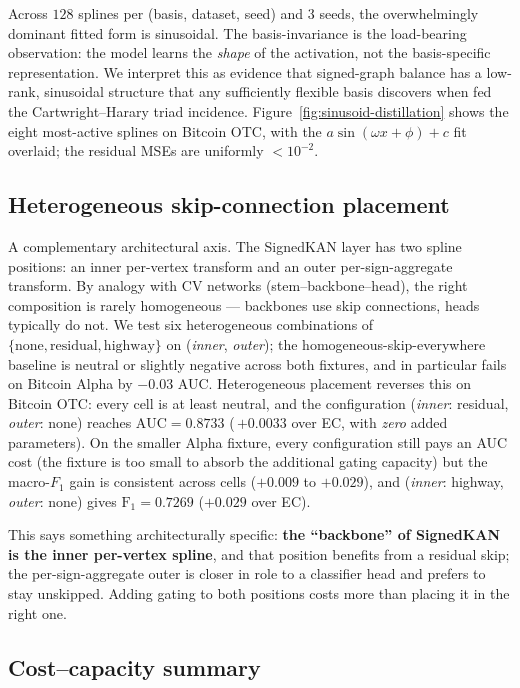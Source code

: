 Across $128$ splines per (basis, dataset, seed) and $3$ seeds, the
overwhelmingly dominant fitted form is sinusoidal. The
basis-invariance is the load-bearing observation: the model learns
the \emph{shape} of the activation, not the basis-specific
representation. We interpret this as evidence that signed-graph
balance has a low-rank, sinusoidal structure that any sufficiently
flexible basis discovers when fed the Cartwright--Harary triad
incidence.
Figure~\ref{fig:sinusoid-distillation} shows the eight most-active
splines on Bitcoin OTC, with the $a\sin(\omega x + \phi) + c$ fit
overlaid; the residual MSEs are uniformly $<\!10^{-2}$.

\subsection{Heterogeneous skip-connection placement}
\label{sec:heterogeneous-skip}

A complementary architectural axis. The SignedKAN layer has two
spline positions: an inner per-vertex transform and an outer
per-sign-aggregate transform. By analogy with CV networks
(stem--backbone--head), the right composition is rarely
homogeneous --- backbones use skip connections, heads typically do
not. We test six heterogeneous combinations of
$\{\text{none}, \text{residual}, \text{highway}\}$ on
(\textit{inner}, \textit{outer}); the homogeneous-skip-everywhere
baseline is neutral or slightly negative across both fixtures, and
in particular fails on Bitcoin Alpha by $-0.03$ AUC. Heterogeneous
placement reverses this on Bitcoin OTC: every cell is at least
neutral, and the configuration (\textit{inner}: residual,
\textit{outer}: none) reaches $\mathrm{AUC}\!=\!0.8733$
(\,$+0.0033$ over EC, with \emph{zero} added parameters). On the
smaller Alpha fixture, every configuration still pays an AUC cost
(the fixture is too small to absorb the additional gating capacity)
but the macro-$F_1$ gain is consistent across cells
($+0.009$ to $+0.029$), and (\textit{inner}: highway,
\textit{outer}: none) gives $\mathrm{F}_1\!=\!0.7269$
($+0.029$ over EC).

This says something architecturally specific: \textbf{the
``backbone'' of SignedKAN is the inner per-vertex spline}, and that
position benefits from a residual skip; the per-sign-aggregate
outer is closer in role to a classifier head and prefers to stay
unskipped. Adding gating to both positions costs more than placing
it in the right one.

\subsection{Cost--capacity summary}
\label{sec:cost-capacity}

